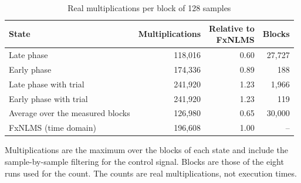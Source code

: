 \begin{table}[tbp]
\centering
\footnotesize
\setlength{\tabcolsep}{4pt}
\caption{Real multiplications per block of 128 samples}
\label{tab:atsip-5}
\par\smallskip
\begin{tabular}{lrrr}
\toprule
State & Multiplications & \makecell{Relative to\\FxNLMS} & Blocks \\
\midrule
Late phase & 118,016 & 0.60 & 27,727 \\
Early phase & 174,336 & 0.89 & 188 \\
Late phase with trial & 241,920 & 1.23 & 1,966 \\
Early phase with trial & 241,920 & 1.23 & 119 \\
Average over the measured blocks & 126,980 & 0.65 & 30,000 \\
FxNLMS (time domain) & 196,608 & 1.00 & -- \\
\bottomrule
\end{tabular}
\par\medskip
\begin{minipage}{0.98\textwidth}
\scriptsize
Multiplications are the maximum over the blocks of each state and include the sample-by-sample filtering for the control signal. Blocks are those of the eight runs used for the count. The counts are real multiplications, not execution times.\par
\end{minipage}
\end{table}
